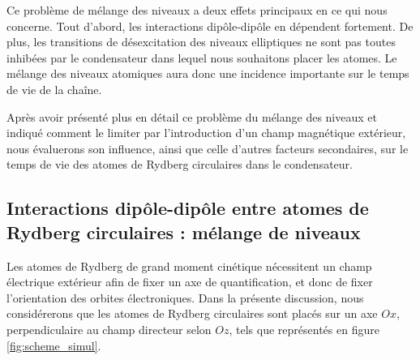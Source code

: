 Ce problème de mélange des niveaux a deux effets principaux en ce qui nous concerne.
Tout d'abord, les interactions dipôle-dipôle en dépendent fortement.
De plus, les transitions de désexcitation des niveaux elliptiques ne sont pas toutes inhibées par le condensateur dans lequel nous souhaitons placer les atomes.
Le mélange des niveaux atomiques aura donc une incidence importante sur le temps de vie de la chaîne.

Après avoir présenté plus en détail ce problème du mélange des niveaux et indiqué comment le limiter par l'introduction d'un champ magnétique extérieur, nous évaluerons son influence, ainsi que celle d'autres facteurs secondaires, sur le temps de vie des atomes de Rydberg circulaires dans le condensateur. 

\subsection{Interactions dipôle-dipôle entre atomes de Rydberg circulaires : mélange de niveaux}
\label{subsec:circ_interactions}

\noindent Les atomes de Rydberg de grand moment cinétique nécessitent un champ électrique extérieur afin de fixer un axe de quantification, et donc de fixer l'orientation des orbites électroniques.
Dans la présente discussion, nous considérerons que les atomes de Rydberg circulaires sont placés sur un axe $Ox$, perpendiculaire au champ directeur selon $Oz$, tels que représentés en figure \eqref{fig:scheme_simul}.

